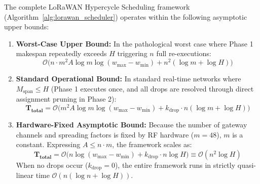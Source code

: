 \documentclass{article}
\begin{document}
\begin{theorem}
\label{thm:overall_complexity}
The complete LoRaWAN Hypercycle Scheduling framework (Algorithm~\ref{alg:lorawan_scheduler}) operates within the following asymptotic upper bounds:
\begin{enumerate}
    \item \textbf{Worst-Case Upper Bound:} In the pathological worst case where Phase 1 makespan repeatedly exceeds $H$ triggering $n$ full re-executions:
    \begin{equation}
    \mathcal{O}\Big(n \cdot m^2 A \log m \log(w_{\max} - w_{\min}) + n^2 (\log m + \log H)\Big)
    \end{equation}
    \item \textbf{Standard Operational Bound:} In standard real-time networks where $M_{\text{span}} \le H$ (Phase 1 executes once, and all drops are resolved through direct assignment pruning in Phase 2):
    \begin{equation}
    \label{eq:total_practical_complexity}
    \mathbf{T_{\text{total}}} = \mathcal{O}\Big(m^2 A \log m \log(w_{\max} - w_{\min}) + k_{\text{drop}} \cdot n (\log m + \log H)\Big)
    \end{equation}
    \item \textbf{Hardware-Fixed Asymptotic Bound:} Because the number of gateway channels and spreading factors is fixed by RF hardware ($m = 48$), $m$ is a constant. Expressing $A \le n \cdot m$, the framework scales as:
    \begin{equation}
    \mathbf{T_{\text{total}}} = \mathcal{O}\Big(n \log(w_{\max} - w_{\min}) + k_{\text{drop}} \cdot n \log H\Big) \equiv \mathcal{O}\left(n^2 \log H\right)
    \end{equation}
    When no drops occur ($k_{\text{drop}} = 0$), the entire framework runs in strictly quasi-linear time $\mathcal{O}(n (\log n + \log H))$.
\end{enumerate}
\end{theorem}
\end{document}
